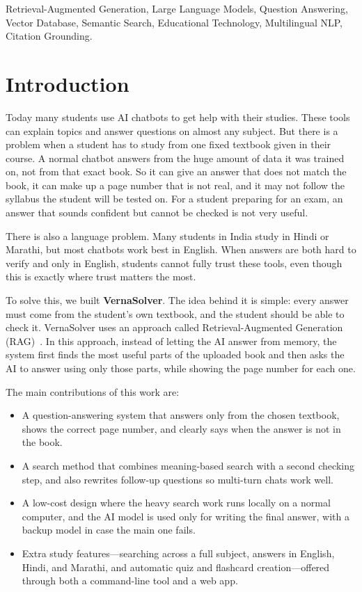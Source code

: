 \documentclass[conference]{IEEEtran}
\begin{document}
\begin{IEEEkeywords}
Retrieval-Augmented Generation, Large Language Models, Question
Answering, Vector Database, Semantic Search, Educational Technology,
Multilingual NLP, Citation Grounding.
\end{IEEEkeywords}

\section{Introduction}
Today many students use AI chatbots to get help with their studies.
These tools can explain topics and answer questions on almost any
subject. But there is a problem when a student has to study from one
fixed textbook given in their course. A normal chatbot answers from the
huge amount of data it was trained on, not from that exact book. So it
can give an answer that does not match the book, it can make up a page
number that is not real, and it may not follow the syllabus the student
will be tested on. For a student preparing for an exam, an answer that
sounds confident but cannot be checked is not very useful.

There is also a language problem. Many students in India study in Hindi
or Marathi, but most chatbots work best in English. When answers are
both hard to verify and only in English, students cannot fully trust
these tools, even though this is exactly where trust matters the most.

To solve this, we built \textbf{VernaSolver}. The idea behind it is
simple: every answer must come from the student's own textbook, and the
student should be able to check it. VernaSolver uses an approach called
Retrieval-Augmented Generation (RAG)~\cite{lewis2020rag}. In this
approach, instead of letting the AI answer from memory, the system first
finds the most useful parts of the uploaded book and then asks the AI to
answer using only those parts, while showing the page number for each
one.

The main contributions of this work are:
\begin{itemize}
\item A question-answering system that answers only from the chosen
textbook, shows the correct page number, and clearly says when the
answer is not in the book.
\item A search method that combines meaning-based search with a second
checking step, and also rewrites follow-up questions so multi-turn
chats work well.
\item A low-cost design where the heavy search work runs locally on a
normal computer, and the AI model is used only for writing the final
answer, with a backup model in case the main one fails.
\item Extra study features---searching across a full subject, answers in
English, Hindi, and Marathi, and automatic quiz and flashcard
creation---offered through both a command-line tool and a web app.
\end{itemize}
\end{document}

